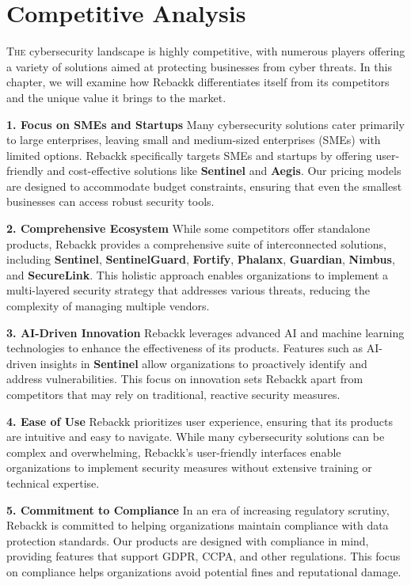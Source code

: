 \chapter{Competitive Analysis}

\lettrine{T}{he} cybersecurity landscape is highly competitive, with numerous players offering a variety of solutions aimed at protecting businesses from cyber threats. In this chapter, we will examine how Rebackk differentiates itself from its competitors and the unique value it brings to the market.

\textbf{1. Focus on SMEs and Startups}  
Many cybersecurity solutions cater primarily to large enterprises, leaving small and medium-sized enterprises (SMEs) with limited options. Rebackk specifically targets SMEs and startups by offering user-friendly and cost-effective solutions like \textbf{Sentinel} and \textbf{Aegis}. Our pricing models are designed to accommodate budget constraints, ensuring that even the smallest businesses can access robust security tools.

\textbf{2. Comprehensive Ecosystem}  
While some competitors offer standalone products, Rebackk provides a comprehensive suite of interconnected solutions, including \textbf{Sentinel}, \textbf{SentinelGuard}, \textbf{Fortify}, \textbf{Phalanx}, \textbf{Guardian}, \textbf{Nimbus}, and \textbf{SecureLink}. This holistic approach enables organizations to implement a multi-layered security strategy that addresses various threats, reducing the complexity of managing multiple vendors.

\textbf{3. AI-Driven Innovation}  
Rebackk leverages advanced AI and machine learning technologies to enhance the effectiveness of its products. Features such as AI-driven insights in \textbf{Sentinel} allow organizations to proactively identify and address vulnerabilities. This focus on innovation sets Rebackk apart from competitors that may rely on traditional, reactive security measures.

\textbf{4. Ease of Use}  
Rebackk prioritizes user experience, ensuring that its products are intuitive and easy to navigate. While many cybersecurity solutions can be complex and overwhelming, Rebackk’s user-friendly interfaces enable organizations to implement security measures without extensive training or technical expertise.

\textbf{5. Commitment to Compliance}  
In an era of increasing regulatory scrutiny, Rebackk is committed to helping organizations maintain compliance with data protection standards. Our products are designed with compliance in mind, providing features that support GDPR, CCPA, and other regulations. This focus on compliance helps organizations avoid potential fines and reputational damage.

